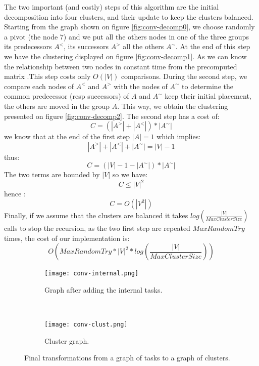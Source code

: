 \documentclass[10pt, conference, compsocconf,pdftex,dvipsnames]{IEEEtran}
\begin{document}
The two important (and costly) steps of this algorithm are the initial
decomposition into four clusters, and their update to keep the clusters
balanced.  Starting from the graph shown on figure \ref{fig:conv-decomp0}, we
choose randomly a pivot (the node $7$) and we put all the others nodes in one
of the three groups its predecessors $A^<$, its successors $A^>$ all the
others $A^{\sim}$. At the end of this step we have the clustering displayed on
figure \ref{fig:conv-decomp1}. As we can know the relationship between two
nodes in constant time from the precomputed matrix .This step costs only
$O(|V|)$ comparisons. During the second step, we compare each nodes of $A^<$
and $A^>$ with the nodes of $A^{\sim}$ to determine the common predecessor
(resp successors) of $A$ and $A^{\sim}$ keep their initial placement, the
others are moved in the group $A$.  This way, we obtain the clustering
presented on figure \ref{fig:conv-decomp2}. The second step has a cost of:
$$C=(|A^>|+|A^<|)*|A^{\sim}|$$ 
we know that at the end of the first step $|A|=1$ which implies: 
$$|A^>|+|A^<|+|A^{\sim}|=|V|-1$$
thus:
$$C=(|V|-1-|A^{\sim}|)*|A^{\sim}|$$ 
The two terms are bounded by $|V|$ so we have: 
$$C\leq|V|^2$$
hence :
$$C=O(|V^2|)$$ 
Finally, if we assume that the clusters are balanced it takes
$log\left(\frac{|V|}{MaxClusterSize}\right)$ calls to stop the recursion, as
the two first step are repeated $MaxRandomTry$ times, the
cost of our implementation is:
$$O\left(MaxRandomTry*|V|^2*log\left(\frac{|V|}{MaxClusterSize}\right)\right)$$

\begin{figure}[h!]
    \centering
    \begin{subfigure}{0.23\textwidth}
        \centering
        \texttt{[image: conv-internal.png]}
        \caption{Graph after adding the internal tasks.}
        \label{fig:conv-int}
    \end{subfigure}
    ~
    \begin{subfigure}{0.12\textwidth}
        \centering
        \texttt{[image: conv-clust.png]}
        \caption{Cluster graph.}
        \label{fig:conv-clust}
    \end{subfigure}
    \caption{Final transformations from a graph of tasks to a graph of
    clusters.}
    \label{fig:conv-end}
\end{figure}
\end{document}
